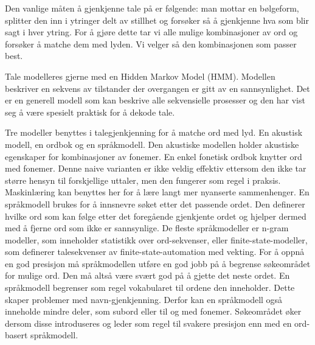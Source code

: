 Den vanlige måten å gjenkjenne tale på er følgende: man mottar en bølgeform, splitter den inn i ytringer delt av stillhet og forsøker så å gjenkjenne hva som blir sagt i hver ytring. For å gjøre dette tar vi alle mulige kombinasjoner av ord og forsøker å matche dem med lyden. Vi velger så den kombinasjonen som passer best.

Tale modelleres gjerne med en Hidden Markov Model (HMM). Modellen beskriver en sekvens av tilstander der overgangen er gitt av en sannsynlighet. Det er en generell modell som kan beskrive alle sekvensielle prosesser og den har vist seg å være spesielt praktisk for å dekode tale.

Tre modeller benyttes i talegjenkjenning for å matche ord med lyd. En akustisk modell, en ordbok og en språkmodell. Den akustiske modellen holder akustiske egenskaper for kombinasjoner av fonemer. En enkel fonetisk ordbok knytter ord med fonemer. Denne naive varianten er ikke veldig effektiv ettersom den ikke tar større hensyn til forskjellige uttaler, men den fungerer som regel i praksis. Maskinlæring kan benyttes her for å lære langt mer nyanserte sammenhenger. En språkmodell brukes for å innsnevre søket etter det passende ordet. Den definerer hvilke ord som kan følge etter det foregående gjenkjente ordet og hjelper dermed med å fjerne ord som ikke er sannsynlige. De fleste språkmodeller er n-gram modeller, som inneholder statistikk over ord-sekvenser, eller finite-state-modeller, som definerer talesekvenser av finite-state-automation med vekting. For å oppnå en god presisjon må språkmodellen utføre en god jobb på å begrense søkeområdet for mulige ord. Den må altså være svært god på å gjette det neste ordet. En språkmodell begrenser som regel vokabularet til ordene den inneholder. Dette skaper problemer med navn-gjenkjenning. Derfor kan en språkmodell også inneholde mindre deler, som subord eller til og med fonemer. Søkeområdet øker dersom disse introduseres og leder som regel til svakere presisjon enn med en ord-basert språkmodell.




